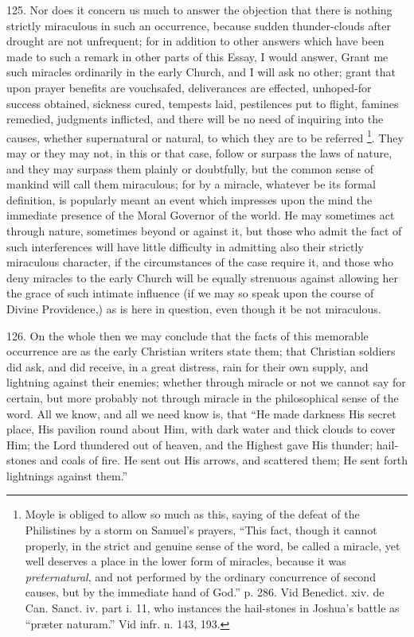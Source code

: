 125.
Nor does it concern us much to answer the objection that there is
nothing strictly miraculous in such an occurrence, because sudden
thunder-clouds after drought are not unfrequent; for in addition to
other answers which have been made to such a remark in other parts of
this Essay, I would answer, Grant me such miracles ordinarily in the
early Church, and I will ask no other; grant that upon prayer benefits
are vouchsafed, deliverances are effected, unhoped-for success
obtained, sickness cured, tempests laid, pestilences put to flight,
famines remedied, judgments inflicted, and there will be no need of
inquiring into the causes, whether supernatural or natural, to which
they are to be referred \footnote{Moyle is obliged to allow so much as this, saying of the defeat of the
Philistines by a storm on Samuel's prayers, ``This fact, though it
cannot properly, in the strict and genuine sense of the word, be
called a miracle, yet well deserves a place in the lower form of
miracles, because it was \emph{preternatural}, and not performed by
the ordinary concurrence of second causes, but by the immediate hand
of God.'' p. 286. Vid Benedict. xiv. de Can. Sanct. iv. part i. 11, who
instances the hail-stones in Joshua's battle as ``præter naturam.'' Vid
infr. n. 143, 193.}.
They may or they may not, in this or that case, follow or surpass the
laws of nature, and they may surpass them plainly or doubtfully, but
the common sense of mankind will call them miraculous; for by a
miracle, whatever be its formal definition, is popularly meant an
event which impresses upon the mind the immediate presence of the
Moral Governor of the world. He may sometimes act through nature,
sometimes beyond or against it, but those who admit the fact of such
interferences will have little difficulty in admitting also their
strictly miraculous character, if the circumstances of the case
require it, and those who deny miracles to the early Church will be
equally strenuous against allowing her the grace of such intimate
influence (if we may so speak upon the course of Divine Providence,) as
is here in question, even though it be not miraculous.

126.
On the whole then we may conclude that the facts of this memorable
occurrence are as the early Christian writers state them; that
Christian soldiers did ask, and did receive, in a great distress, rain
for their own supply, and lightning against their enemies; whether
through miracle or not we cannot say for certain, but more probably
not through miracle in the philosophical sense of the word. All we
know, and all we need know is, that ``He made darkness His secret
place, His pavilion round about Him, with dark water and thick clouds
to cover Him; the Lord thundered out of heaven, and the Highest gave
His thunder; hail-stones and coals of fire. He sent out His arrows,
and scattered them; He sent forth lightnings against them.''

